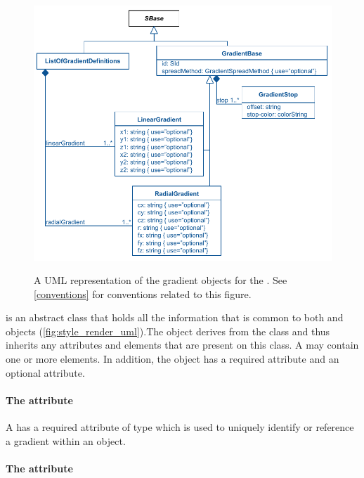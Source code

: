 \begin{figure}[!ht]
  \centering
  \includegraphics{images/render-gradient-definitions-uml}\\
  \caption{A UML representation of the gradient objects for the \RenderPackage.  See \ref{conventions} for conventions related to this figure. }
  \label{fig:gradient_render_uml}
\end{figure}


\GradientBase is an abstract class that holds all the information that is common to both \RadialGradient and \LinearGradient objects (\ref{fig:style_render_uml}).The \GradientBase object derives from the \SBase class and thus inherits
any attributes and elements that are present on this class.
A \GradientBase may contain one or more \GradientStop elements.
In addition, the \GradientBase object has a required  attribute and an optional  attribute.

\paragraph{The \fixttspace{} attribute}

A \GradientBase has a required attribute  of type
 which is used to uniquely identify or reference a gradient within an \RenderInformation object.

\paragraph{The \fixttspace{} attribute}

